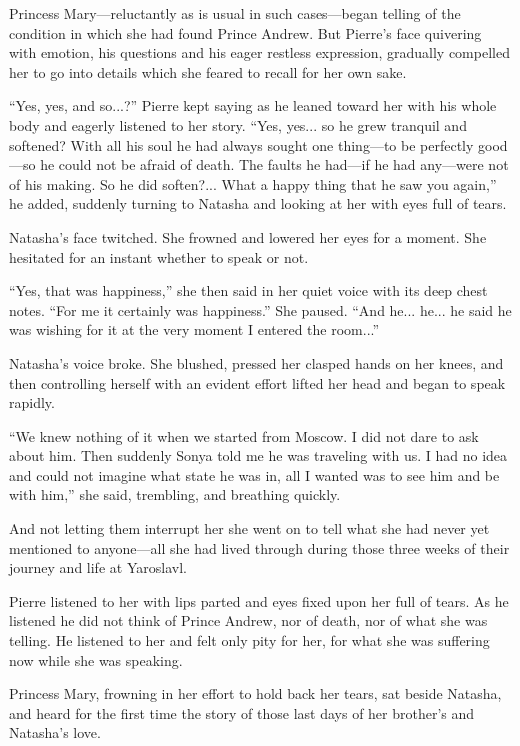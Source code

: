 Princess Mary---reluctantly as is usual in such cases---began
telling of the condition in which she had found Prince
Andrew. But Pierre's face quivering with emotion, his questions
and his eager restless expression, gradually compelled her to go
into details which she feared to recall for her own sake.

``Yes, yes, and so...?'' Pierre kept saying as he leaned toward
her with his whole body and eagerly listened to her story. ``Yes,
yes... so he grew tranquil and softened? With all his soul he had
always sought one thing---to be perfectly good---so he could not
be afraid of death. The faults he had---if he had any---were not
of his making. So he did soften?... What a happy thing that he
saw you again,'' he added, suddenly turning to Natasha and
looking at her with eyes full of tears.

Natasha's face twitched. She frowned and lowered her eyes for a
moment.  She hesitated for an instant whether to speak or not.

``Yes, that was happiness,'' she then said in her quiet voice
with its deep chest notes. ``For me it certainly was happiness.''
She paused. ``And he... he... he said he was wishing for it at
the very moment I entered the room...''

Natasha's voice broke. She blushed, pressed her clasped hands on
her knees, and then controlling herself with an evident effort
lifted her head and began to speak rapidly.

``We knew nothing of it when we started from Moscow. I did not
dare to ask about him. Then suddenly Sonya told me he was
traveling with us. I had no idea and could not imagine what state
he was in, all I wanted was to see him and be with him,'' she
said, trembling, and breathing quickly.

And not letting them interrupt her she went on to tell what she
had never yet mentioned to anyone---all she had lived through
during those three weeks of their journey and life at Yaroslavl.

Pierre listened to her with lips parted and eyes fixed upon her
full of tears. As he listened he did not think of Prince Andrew,
nor of death, nor of what she was telling. He listened to her and
felt only pity for her, for what she was suffering now while she
was speaking.

Princess Mary, frowning in her effort to hold back her tears, sat
beside Natasha, and heard for the first time the story of those
last days of her brother's and Natasha's love.

